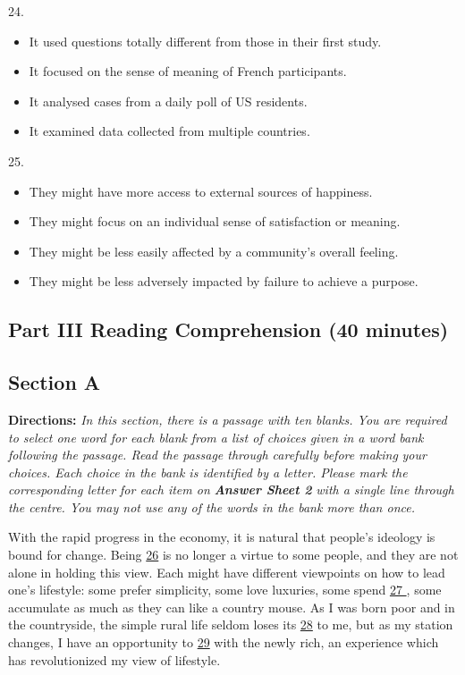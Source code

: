 \documentclass[UTF8,11pt]{ctexart}
\begin{document}
24.


\begin{itemize}[leftmargin=2em,itemsep=.2em,topsep=.4em]\item[A.] It used questions totally different from those in their first study.
\item[B.] It focused on the sense of meaning of French participants.
\item[C.] It analysed cases from a daily poll of US residents.
\item[D.] It examined data collected from multiple countries.
\end{itemize}

25.


\begin{itemize}[leftmargin=2em,itemsep=.2em,topsep=.4em]\item[A.] They might have more access to external sources of happiness.
\item[B.] They might focus on an individual sense of satisfaction or meaning.
\item[C.] They might be less easily affected by a community’s overall feeling.
\item[D.] They might be less adversely impacted by failure to achieve a purpose.
\end{itemize}

\subsection*{\textbf{Part III Reading Comprehension (40 minutes)}}


\subsection*{\textbf{Section A}}


\textbf{Directions:} \textit{In this section, there is a passage with ten blanks. You are required to select one word for each blank} \textit{from a list of choices given in a word bank following the passage. Read the passage through carefully before making} \textit{your choices. Each choice in the bank is identified by a letter. Please mark the corresponding letter for each item on} \textbf{\textit{Answer Sheet 2}}\textit{ with a single line through the centre. You may not use any of the words in the bank more than once.}


With the rapid progress in the economy, it is natural that people’s ideology is bound for change. Being \uline{26} is no longer a virtue to some people, and they are not alone in holding this view. Each might have different viewpoints on how to lead one’s lifestyle: some prefer simplicity, some love luxuries, some spend \uline{27 }, some accumulate as much as they can like a country mouse. As I was born poor and in the countryside, the simple rural life seldom loses its \uline{28} to me, but as my station changes, I have an opportunity to \uline{29} with the newly rich, an experience which has revolutionized my view of lifestyle.
\end{document}
